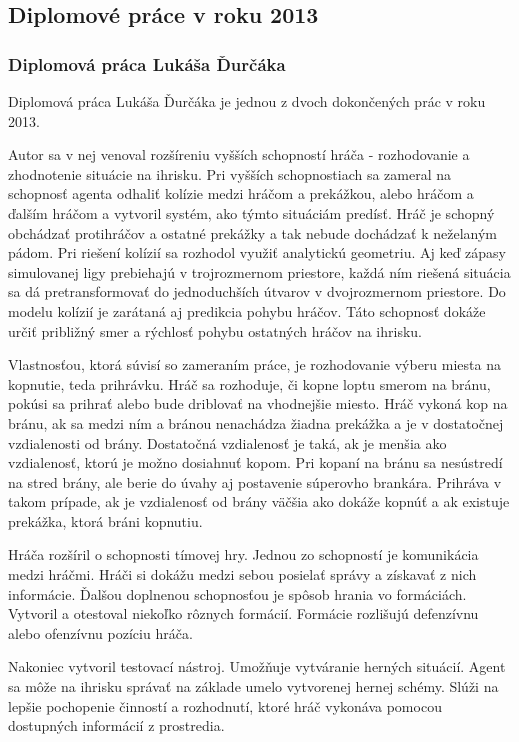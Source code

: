 \subsection{Diplomové práce v roku 2013}
\subsubsection{Diplomová práca Lukáša Ďurčáka} \label{sec_durcak}

Diplomová práca Lukáša Ďurčáka\cite{durcak} je jednou z dvoch dokončených prác v roku 2013.

Autor sa v nej venoval rozšíreniu vyšších schopností hráča - rozhodovanie a zhodnotenie situácie na ihrisku. Pri vyšších schopnostiach sa zameral na schopnosť agenta odhaliť kolízie medzi hráčom a prekážkou, alebo hráčom a ďalším hráčom a vytvoril systém, ako týmto situáciám predísť. Hráč je schopný obchádzať protihráčov a ostatné prekážky a tak nebude dochádzať k neželaným pádom. Pri riešení kolízií sa rozhodol využiť analytickú geometriu. Aj keď zápasy simulovanej ligy prebiehajú v trojrozmernom priestore, každá ním riešená situácia sa dá pretransformovať do jednoduchších útvarov v dvojrozmernom priestore. Do modelu kolízií je zarátaná aj predikcia pohybu hráčov. Táto schopnosť dokáže určiť približný smer a rýchlosť pohybu ostatných hráčov na ihrisku. 

Vlastnosťou, ktorá súvisí so zameraním práce, je rozhodovanie výberu miesta na kopnutie, teda prihrávku. Hráč sa rozhoduje, či kopne loptu smerom na bránu, pokúsi sa prihrať alebo bude driblovať na vhodnejšie miesto. Hráč vykoná kop na bránu, ak sa medzi ním a bránou nenachádza žiadna prekážka a je v dostatočnej vzdialenosti od brány. Dostatočná vzdialenosť je taká, ak je menšia ako vzdialenosť, ktorú je možno dosiahnuť kopom. Pri kopaní na bránu sa nesústredí na stred brány, ale berie do úvahy aj postavenie súperovho brankára. Prihráva v takom prípade, ak je vzdialenosť od brány väčšia ako dokáže kopnúť a ak existuje prekážka, ktorá bráni kopnutiu.

Hráča rozšíril o schopnosti tímovej hry. Jednou zo schopností je komunikácia medzi hráčmi. Hráči si dokážu medzi sebou posielať správy a získavať z nich informácie. Ďalšou doplnenou schopnosťou je spôsob hrania vo formáciách. Vytvoril a otestoval niekoľko rôznych formácií. Formácie rozlišujú defenzívnu alebo ofenzívnu pozíciu hráča.

Nakoniec vytvoril testovací nástroj. Umožňuje vytváranie herných situácií. Agent sa môže na ihrisku správať na základe umelo vytvorenej hernej schémy. Slúži na lepšie pochopenie činností a rozhodnutí, ktoré hráč vykonáva pomocou dostupných informácií z prostredia.